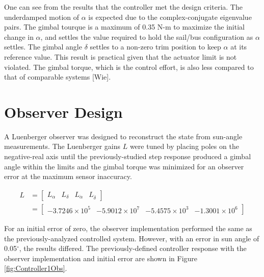 \documentclass[]{aiaa-tc}%
\begin{document}
	One can see from the results that the controller met the design criteria. The underdamped motion of $\alpha$ is expected due to the complex-conjugate eigenvalue pairs. The gimbal tourque is a maximum of 0.35 N-m to maximize the initial change in $\alpha$, and settles the value required to hold the sail/bus configuration as $\alpha$ settles. The gimbal angle $\delta$ settles to a non-zero trim position to keep $\alpha$ at its reference value. This result is practical given that the actuator limit is not violated. The gimbal torque, which is the control effort, is also less compared to that of comparable systems [Wie].

	\section{Observer Design}

	A Luenberger observer was designed to reconstruct the state from sun-angle measurements. The Luenberger gains $L$ were tuned by placing poles on the negative-real axis until the previously-studied step response produced a gimbal angle within the limits and the gimbal torque was minimized for an observer error at the maximum sensor inaccuracy.

\begin{equation}
\begin{aligned}
L &= \begin{bmatrix}
L_{\alpha} & L_{\delta} & L_{\dot{\alpha}} & L_{\dot{\delta}} 
\end{bmatrix}\\ 
 &= \begin{bmatrix}
-3.7246\times10^5 & -5.9012\times10^7 & -5.4575\times10^3 & -1.3001\times10^6 
\end{bmatrix}
\end{aligned}
\end{equation}

	For an initial error of zero, the observer implementation performed the same as the previously-analyzed controlled system. However, with an error in sun angle of 0.05$^{\circ}$, the results differed. The previously-defined controller response with the observer implementation and initial error are shown in Figure  \ref{fig:Controller1Obs}.
\end{document}
